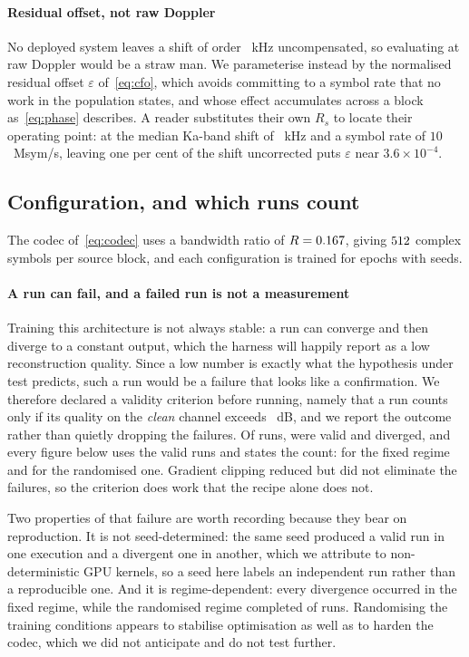 \documentclass[preprint,11pt,3p]{elsarticle}
\begin{document}
\paragraph{Residual offset, not raw Doppler}
No deployed system leaves a shift of order \numDopKaMed~kHz uncompensated, so evaluating at raw
Doppler would be a straw man. We parameterise instead by the normalised residual offset $\varepsilon$ of~\eqref{eq:cfo},
which avoids committing to a symbol rate that no work in the population states, and whose effect
accumulates across a block as~\eqref{eq:phase} describes. A reader substitutes their own
$R_s$ to locate their operating point: at the median Ka-band shift of \numDopKaMed~kHz and a
symbol rate of $10$~Msym/s, leaving one per cent of the shift uncorrected puts
$\varepsilon$ near $3.6\times10^{-4}$.


\subsection{Configuration, and which runs count}

The codec of~\eqref{eq:codec} uses a bandwidth ratio of $R = 0.167$, giving $512{}$
complex symbols per source block, and each configuration is trained for \numEpochs{} epochs with
\numSeedsB{} seeds.

\paragraph{A run can fail, and a failed run is not a measurement}
Training this architecture is not always stable: a run can converge and then diverge to a
constant output, which the harness will happily report as a low reconstruction quality. Since a
low number is exactly what the hypothesis under test predicts, such a run would be a failure that
looks like a confirmation. We therefore declared a validity criterion before running, namely that
a run counts only if its quality on the \emph{clean} channel exceeds \numValidMin~dB, and we
report the outcome rather than quietly dropping the failures. Of \numRunsTot{} runs, \numRunsOk{} were valid and \numRunsBad{} diverged, and every figure
below uses the valid runs and states the count: \numOkFixed{} for the fixed regime and
\numOkAug{} for the randomised one. Gradient clipping reduced but did not eliminate the
failures, so the criterion does work that the recipe alone does not.

Two properties of that failure are worth recording because they bear on reproduction. It is not
seed-determined: the same seed produced a valid run in one execution and a divergent one in
another, which we attribute to non-deterministic GPU kernels, so a seed here labels an
independent run rather than a reproducible one. And it is regime-dependent: every divergence
occurred in the fixed regime, while the randomised regime completed \numOkAug{} of
\numOkAug{} runs. Randomising the training conditions appears to stabilise optimisation as well
as to harden the codec, which we did not anticipate and do not test further.
\end{document}
